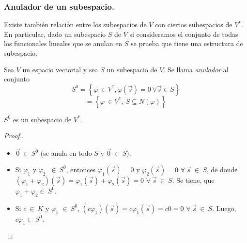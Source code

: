 \bigskip

\subsubsection{Anulador de un subespacio.}

Existe también relación entre  los subespacios de $V$ con ciertos subespacios de $V^*$. En particular, dado un subespacio $S$ de $V$ si consideramos el conjunto de todas los funcionales  lineales que se anulan en $S$ se prueba  que tiene una estructura de subespacio.

\bigskip

\bigskip

\begin{definition}
\noindent
Sea $V$ un espacio vectorial y sea $S$ un subespacio de $V$. Se llama \textit{anulador} al conjunto 
$$S^0=\left\{\varphi~ \in V^*, \varphi(\Vec{s})=0 ~ \forall \Vec{s} \in S\right\}$$
$$=\left\{\varphi~ \in V^*, ~ S \subseteq N(\varphi) \right\}$$
\end{definition}


\bigskip


\begin{theorem} $S^0$ es un subespacio de $V^*$.



\begin{proof}
\begin{itemize}
\item
$\Vec{0}~ \in ~ S^0 $ (se anula en todo $S$ y $\Vec{0}~ \in ~ S$).
\item
Si $\varphi_1$ y $\varphi_2$ $ ~ \in ~ S^0$, entonces $\varphi_1(\Vec{s})=0$ y  $\varphi_2(\Vec{s})=0$   $\forall~\Vec{s} ~ \in ~ S $, de donde $(\varphi_1 + \varphi_2)(\Vec{s})=\varphi_1(\Vec{s})+\varphi_2(\Vec{s})  =0 $  $\forall~\Vec{s} ~ \in ~ S $. Se tiene,  que 
$\varphi_1 + \varphi_2  \in ~S^0$.
\item
Si $c ~\in ~ K $ y $\varphi_1$ $ \in ~ S^0$, $ (  c \varphi_1)(\Vec{s})=c \varphi_1(\Vec{s})= c 0= 0 $  $\forall~\Vec{s} ~ \in ~ S $. Luego, $  c \varphi_1  \in ~S^0$.
\end{itemize}
\end{proof}
\end{theorem} 

\bigskip


